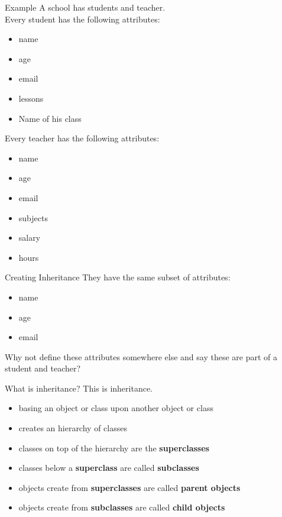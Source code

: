 \begin{frame}{Example}
	A school has students and teacher.\\
	Every student has the following attributes:
	\begin{itemize}
		\item name
		\item age
		\item email
		\item lessons
		\item Name of his class
	\end{itemize}
	Every teacher has the following attributes:
	\begin{itemize}
		\item name
		\item age
		\item email
		\item subjects
		\item salary
		\item hours
	\end{itemize}
\end{frame}

\begin{frame}{Creating Inheritance}
	They have the same subset of attributes:
	\begin{itemize}
		\item name
		\item age
		\item email
	\end{itemize}
	Why not define these attributes somewhere else and say these are part of a student and teacher?
\end{frame}

\begin{frame}{What is inheritance?}
	This is inheritance.
	\begin{itemize}
		\item basing an object or class upon another object or class
		\item creates an hierarchy of classes
		\item classes on top of the hierarchy are the \textbf{superclasses}
		\item classes below a \textbf{superclass} are called \textbf{subclasses}
		\item objects create from \textbf{superclasses} are called \textbf{parent objects}
		\item objects create from \textbf{subclasses} are called \textbf{child objects}
	\end{itemize}
\end{frame}

